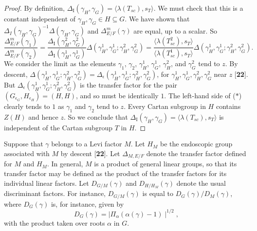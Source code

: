 \documentclass{amsart}
\begin{document}
\begin{proof}
By definition,
  $ \Delta_{\text{I}} (\gamma_H, \gamma_G) = 
    \big\langle
      \lambda (T_{sc}), s_T
    \big\rangle $.
We must check that this is a constant independent of
  $ \gamma_H,
    \gamma_G \in  H \subseteq G $.
We have shown that 
    $\Delta_I
     (\gamma_H, \gamma_G) ^{-1}
    \Delta
    (\gamma_H, \gamma_G) $ and
  $ \Delta_{E/F}^m (\gamma)$  
    are equal, up to a scalar.
So
%
\medskip
\begin{equation}\label{eqn:star}
  \frac
     { \Delta_{E/F}^m (\gamma_1) }
     { \Delta_{E/F}^m (\gamma_2) }
  =
  \frac
     { \Delta_{\text{I}} (\gamma_H^2, \gamma_G^2) }
     { \Delta_{\text{I}} (\gamma^{1}_H, \gamma^{1}_G) }
  \Delta
  ( \gamma^{1}_H, \gamma^{1}_G; \gamma_H^2, \gamma_G^2)
  =
  \frac
    { \langle \lambda (T_{sc}^2), s_T \rangle }
    { \langle \lambda (T^1_{sc}), s_T \rangle }
  \Delta
  ( \gamma^{1}_H, \gamma^{1}_G ; \gamma_H^2, \gamma_G^2) .
\tag{$*$}
\end{equation}
\medskip
%
We consider the limit as the elements $\gamma_1$, $\gamma_2$,
  $\gamma^{1}_H$, $\gamma^{1}_G$, $\gamma_H^2$, and $\gamma_G^2$ 
tend
to $z$.
%
By descent,
  $ \Delta
    (\gamma^{1}_H, \gamma^{1}_G ; \gamma_H^2, \gamma_G^2)
    =
    \Delta_{\epsilon} 
    (\gamma^{1}_H, \gamma^{1}_G ; \gamma_H^2, \gamma_G^2) $,
for
  $ \gamma^{1}_H, \gamma^{1}_G , \gamma_H^2, \gamma_G^2 $
near $z$ [{\bf 22}].
%
But 
  $ \Delta_{\epsilon}
    (\gamma^{1}_H, \gamma^{1}_G ; \gamma_H^2, \gamma_G^2) $
is the transfer factor for the pair
  $ (G_{\epsilon_G},  H_{\epsilon_H} ) =
     (H, H) $,
and so must be identically $1$.
The left-hand side of ($*$) clearly tends to $1$ as
  $ \gamma_1$ and $\gamma_2$ tend to  $z$.
Every Cartan subgroup in
  $ H $
contains 
  $ Z(H) $
and hence $z$.
So we conclude that
  $ \Delta_{\text{I}}
     (\gamma_H, \gamma_G ) =
    \langle 
      \lambda(T_{sc}), s_T 
    \rangle $
is independent of the Cartan subgroup $T$ in
  $ H $.
\end{proof}

Suppose that $\gamma$ belongs to a Levi factor $M$.  Let
$H_M$ be the endoscopic group associated with $M$ by descent [{\bf 22}].
Let $\Delta_{M,E/F}$ denote the transfer factor defined
for $M$ and $H_M$.  In general, $M$ is a product of general
linear groups, so that its transfer factor may be defined
as the product of the transfer factors for its individual linear
factors. Let $D_{G/M}(\gamma)$ and $D_{H/H_M}(\gamma)$
denote the usual discriminant factors.  For instance,
$D_{G/M}(\gamma)$ is equal to $D_G(\gamma)/D_M(\gamma)$, where
$D_G(\gamma)$ is, for instance, given by
$$D_G(\gamma) = \mid \Pi_\alpha (\alpha(\gamma) - 1)\mid^{1/2},$$
with the product taken over roots $\alpha$ in $G$. 
\end{document}

